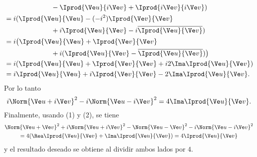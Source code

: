 \begin{sol}
\begin{enumerate}
\begin{align*}
		&\phantom{=}\hspace{6em} -\Iprod{\Ve u}{i\Ve v} + \Iprod{i\Ve v}{i\Ve v}) \\
		&= i(\Iprod{\Ve u}{\Ve u} - (-i^2)\Iprod{\Ve v}{\Ve v}  \\
		&\phantom{=}\hspace{6em} + i\Iprod{\Ve u}{\Ve v}  -i\overline{\Iprod{\Ve u}{\Ve v}}) \\
		&= i\big(\Iprod{\Ve u}{\Ve u} + \Iprod{\Ve v}{\Ve v} \\
		&\phantom{=}\hspace{6em} +i (\Iprod{\Ve u}{\Ve v} - \overline{\Iprod{\Ve u}{\Ve v}})\big) \\
		&= i(\Iprod{\Ve u}{\Ve u} + \Iprod{\Ve v}{\Ve v} +i2\Ima\Iprod{\Ve u}{\Ve v}) \\
		&= i\Iprod{\Ve u}{\Ve u} + i\Iprod{\Ve v}{\Ve v} - 2\Ima\Iprod{\Ve u}{\Ve v}.
		\end{align*}
		Por lo tanto
		\begin{equation}
			i\Norm{\Ve u+i\Ve v}^2 - i\Norm{\Ve u-i\Ve v}^2  = 4 \Ima\Iprod{\Ve u}{\Ve v}.
		\end{equation}
		Finalmente, usando (1) y (2), se tiene
		\begin{multline*}
			 \Norm{\Ve u+\Ve v}^2 + i\Norm{\Ve u+i\Ve v}^2 -\Norm{\Ve u-\Ve v}^2 - i\Norm{\Ve u-i\Ve v}^2 \\
			 = 4(\Rea\Iprod{\Ve u}{\Ve v}+\Ima\Iprod{\Ve u}{\Ve v}) = 4\Iprod{\Ve u}{\Ve v}
		\end{multline*}
		y el resultado deseado se obtiene al dividir ambos lados por $4$.
	\end{enumerate}
\end{sol}
